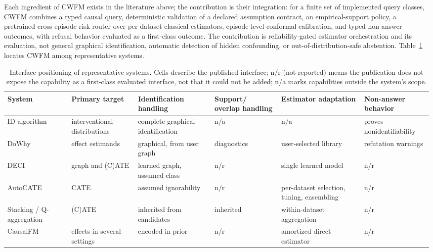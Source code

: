\documentclass[electronics,article,submit,oneauthor]{Definitions/mdpi}
\begin{document}
Each ingredient of CWFM exists in the literature above; the contribution is their integration: for a finite set of implemented query classes, CWFM combines a typed causal query, deterministic validation of a declared assumption contract, an empirical-support policy, a pretrained cross-episode risk router over per-dataset classical estimators, episode-level conformal calibration, and typed non-answer outcomes, with refusal behavior evaluated as a first-class outcome. The contribution is reliability-gated estimator orchestration and its evaluation, not general graphical identification, automatic detection of hidden confounding, or out-of-distribution-safe abstention. Table~\ref{tab:positioning} locates CWFM among representative systems.

\begin{table}[!t]
\caption{Interface positioning of representative systems. Cells describe the published interface; n/r (not reported) means the publication does not expose the capability as a first-class evaluated interface, not that it could not be added; n/a marks capabilities outside the system's scope.\label{tab:positioning}}
\scriptsize
\begin{tabularx}{\textwidth}{>{\raggedright\arraybackslash}p{2.5cm}XXXXX}
\toprule
\textbf{System} & \textbf{Primary target} & \textbf{Identification handling} & \textbf{Support/ overlap handling} & \textbf{Estimator adaptation} & \textbf{Non-answer behavior}\\
\midrule
ID algorithm~\cite{shpitser2006identification} & interventional distributions & complete graphical identification & n/a & n/a & proves nonidentifiability\\
DoWhy~\cite{sharma2020dowhy,blobaum2024dowhygcm} & effect estimands & graphical, from user graph & diagnostics & user-selected library & refutation warnings\\
DECI~\cite{geffner2022deci} & graph and (C)ATE & learned graph, assumed class & n/r & single learned model & n/r\\
AutoCATE~\cite{vanderschueren2025autocate} & CATE & assumed ignorability & n/r & per-dataset selection, tuning, ensembling & n/r\\
Stacking / Q-aggregation~\cite{han2022ensemble,lan2024qaggregation} & (C)ATE & inherited from candidates & inherited & within-dataset aggregation & n/r\\
CausalFM~\cite{ma2025causalfm} & effects in several settings & encoded in prior & n/r & amortized direct estimator & n/r\\

\end{tabularx}
\end{table}
\end{document}
